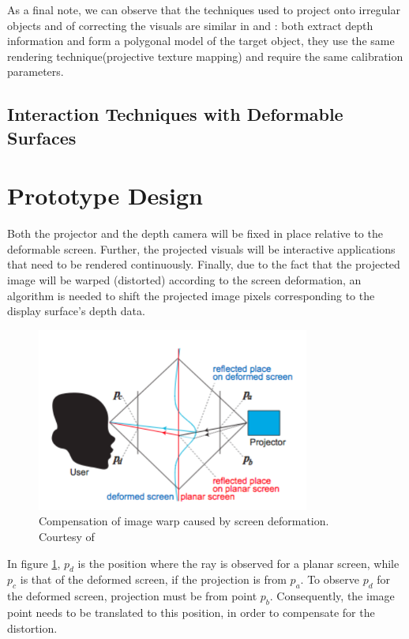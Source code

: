 \documentclass[]{article}
\begin{document}
As a final note, we can observe that the techniques used to project onto irregular objects and of correcting the visuals are similar in \cite{watanabe08} and \cite{raskar98}: both extract depth information and form a polygonal model of the target object, they use the same rendering technique(projective texture mapping) and require the same calibration parameters. 

\subsection{Interaction Techniques with Deformable Surfaces}

\section{Prototype Design}

Both the projector and the depth camera will be fixed in place relative to the deformable screen. Further, the projected visuals will be interactive applications that need to be rendered continuously. Finally, due to the fact that the projected image will be warped (distorted) according to the screen deformation, an algorithm is needed to shift the projected image pixels corresponding to the display surface’s depth data. 

\begin{figure}[hbtp]
    \centering
    \includegraphics[width=0.8\textwidth]{figures/PointProjection.PNG}
    \caption{Compensation of image warp caused by screen deformation. Courtesy of \cite{watanabe08}}
    \label{fig:PointCompensation}
\end{figure}

In figure \ref{fig:PointCompensation}, $p_{d}$ is the position where the ray is observed for a planar screen, while $p_{c}$ is that of the deformed screen, if the projection is from $p_{a}$. To observe $p_{d}$ for the deformed screen, projection must be from point $p_{b}$. Consequently, the image point needs to be translated to this position, in order to compensate for the distortion.\\
\end{document}
